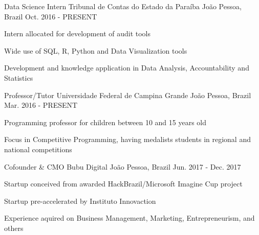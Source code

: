 

\begin{cventries}
  \cventry
    {Data Science Intern} %
    {Tribunal de Contas do Estado da Paraíba} %
    {João Pessoa, Brazil} %
    {Oct. 2016 - PRESENT} %
    {
      \begin{cvitems} %
        \item {Intern allocated for development of audit tools}
        \item {Wide use of SQL, R, Python and Data Visualization tools}
        \item {Development and knowledge application in Data Analysis, Accountability and Statistics}
      \end{cvitems}
    }

  \cventry
    {Professor/Tutor} %
    {Universidade Federal de Campina Grande} %
    {João Pessoa, Brazil} %
    {Mar. 2016 - PRESENT} %
    {
      \begin{cvitems} %
        \item {Programming professor for children between 10 and 15 years old}
        \item {Focus in Competitive Programming, having medalists students in regional and national competitions}
      \end{cvitems}
    }

      \cventry
        {Cofounder \& CMO} %
        {Bubu Digital} %
        {João Pessoa, Brazil} %
        {Jun. 2017 - Dec. 2017} %
        {
          \begin{cvitems} %
            \item {Startup conceived from awarded HackBrazil/Microsoft Imagine Cup project}
            \item {Startup pre-accelerated by Instituto Innovaction}
            \item {Experience aquired on Business Management, Marketing, Entrepreneurism, and others}
          \end{cvitems}
        }


\end{cventries}
